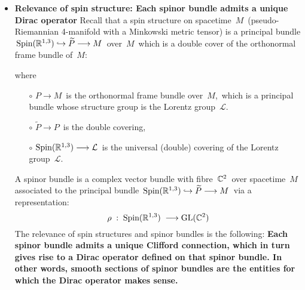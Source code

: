 \begin{itemize}
\item
	\textbf{Relevance of spin structure: Each spinor bundle admits a unique Dirac operator}
	\vskip 0.01cm
	Recall that a spin structure on spacetime \,$M$\, 
	(pseudo-Riemannian 4-manifold with a Minkowski metric tensor)
	is a principal bundle 
	\,$\textnormal{Spin}(\Re^{1,3})  \hookrightarrow \widetilde{P} \longrightarrow M$\,
	over \,$M$\, which is a double cover of the orthonormal frame bundle of \,$M$:
	\begin{center}
	\end{center}
	where
	\begin{itemize}
	\item[$\circ$]
		$P \longrightarrow M$\, is the orthonormal frame bundle over \,$M$,\,
		which is a principal bundle whose structure group is the Lorentz group \,$\mathcal{L}$.\,
	\item[$\circ$]
		$\widetilde{P} \longrightarrow P$\, is the double covering,
	\item[$\circ$]
		$\textnormal{Spin}(\Re^{1,3}) \longrightarrow \mathcal{L}$\,
		is the universal (double) covering of the Lorentz group \,$\mathcal{L}$.
	\end{itemize}
	A spinor bundle is a complex vector bundle with fibre \,$\C^{2}$\, over spacetime \,$M$\, 
	associated to the principal bundle
	\,$\textnormal{Spin}(\Re^{1,3})  \hookrightarrow \widetilde{P} \longrightarrow M$\,
	via a representation:
	\begin{equation*}
	\rho \; : \; \textnormal{Spin}(\Re^{1,3}) \; \longrightarrow \textnormal{GL}(\C^{2})
	\end{equation*}
	The relevance of spin structures and spinor bundles is the following:
	\textbf{Each spinor bundle admits a unique Clifford connection, which in turn gives rise to a Dirac operator
	defined on that spinor bundle.
	In other words, smooth sections of spinor bundles are the entities for which the Dirac operator makes sense.}
\end{itemize}


